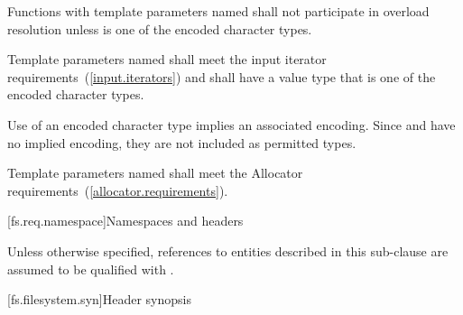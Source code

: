 \pnum
Functions with template parameters named 
shall not participate in overload resolution
unless  is one of the encoded character types.

\pnum
Template parameters named  shall meet the
input iterator requirements~(\ref{input.iterators}) and shall
have a value type that is one of the encoded character types.

\pnum
\begin{note} Use of an encoded character type implies an associated
encoding. Since  and  have no
implied encoding, they are not included as permitted types. \end{note}

\pnum
Template parameters named  shall meet the
Allocator requirements~(\ref{allocator.requirements}).

[fs.req.namespace]{Namespaces and headers}

\pnum
Unless otherwise specified, references to entities described in this
sub-clause are assumed to be qualified with .

[fs.filesystem.syn]{Header  synopsis}
%

